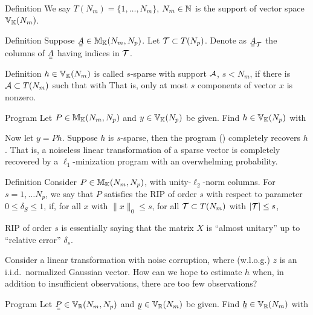 \Result
{Definition}
{
We say \(T (N_m) =\{1, \dotsc, N_m\}\), \(N_m \in \mathbb{N}\) is the support of vector space \(\mathbb{V}_{\mathbb{K}} (N_m)\).
}

\Result
{Definition}
{
Suppose \(\M{A} \in \MB{M}_{\MB{K}} (N_m, N_p)\).
Let \(\mathcal{T} \subset T (N_p)\).
Denote as \(\M{A}_{\MC{T}}\) the columns of \(\M{A}\) having indices in \(\mathcal{T}\).
}

\Result
{Definition}
{
\(h \in \mathbb{V}_{\mathbb{K}} (N_m)\) is called \(s\)-sparse with support \(\mathcal{A}\), \(s <N_m\), if there is \(\mathcal{A} \subset T (N_m)\) such that
%
with
That is, only at most \(s\) components of vector \(x\) is nonzero.
}

\Result
{Program}
{
Let \(P \in \mathbb{M}_{\mathbb{K}} (N_m, N_p)\) and \(y \in \mathbb{V}_{\mathbb{K}} (N_p)\) be given.
Find \(h \in \mathbb{V}_{\mathbb{K}} (N_p)\) with
%
}

Now let \(y =P h\).
Suppose \(h\) is \(s\)-sparse, then the program () completely recovers \(h\).
That is, a noiseless linear transformation of a sparse vector is completely recovered by a \(\ell_1\)-minization program with an overwhelming probability.

\Result
{Definition}
{
Consider \(P \in \mathbb{M}_{\mathbb{K}} (N_m, N_p)\), with unity-\(\ell_2\)-norm columns.
For \(s =1, \dotsc N_p\), we say that \(P\) satisfies the RIP of order \(s\) with respect to parameter \(0 \leq \delta_S \leq 1\), if, for all \(x\) with \(\|x\|_0 \leq s\), for all \(\mathcal{T} \subset T(N_m)\) with \(|\mathcal{T}| \leq s\),
%
}

RIP of order \(s\) is essentially saying that the matrix \(X\) is ``almost unitary'' up to ``relative error'' \(\delta_s\).

Consider a linear transformation with noise corruption,
%
%
where (w.l.o.g.) \(z\) is an i.i.d.\ normalized Gaussian vector.
How can we hope to estimate \(h\) when, in addition to insufficient observations, there are too few observations?

\Result
{Program}
{
Let \(\M{P} \in \MB{V}_\MB{R} (N_m, N_p)\) and \(\V{y} \in \MB{V}_\MB{R} (N_m)\) be given.
Find \(\V{h} \in \MB{V}_\MB{R} (N_m)\) with
%
}

